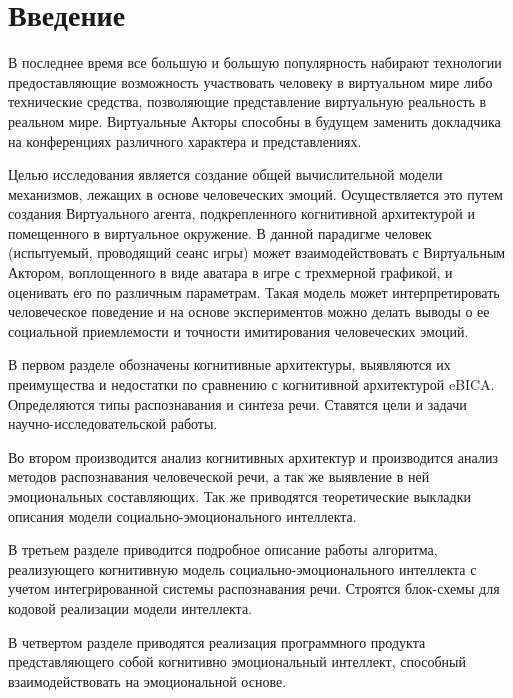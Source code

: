 \chapter*{Введение}
\label{sec:afterwords}


В последнее время все большую и большую популярность набирают технологии предоставляющие возможность участвовать человеку 
в виртуальном мире либо технические средства, позволяющие представление виртуальную реальность в реальном мире. 
Виртуальные Акторы способны в будущем заменить докладчика на конференциях различного характера и представлениях.

Целью исследования является создание общей вычислительной модели механизмов, лежащих в основе человеческих эмоций. Осуществляется это путем создания Виртуального агента, подкрепленного когнитивной архитектурой и помещенного в виртуальное окружение. В данной парадигме человек (испытуемый, проводящий сеанс игры) может взаимодействовать с Виртуальным Актором, воплощенного в виде аватара в игре с трехмерной графикой, и оценивать его по различным параметрам. Такая модель может интерпретировать человеческое поведение и на основе экспериментов можно делать выводы о ее социальной приемлемости и точности имитирования человеческих эмоций.

В первом разделе обозначены когнитивные архитектуры, выявляются их преимущества и недостатки по 
сравнению с когнитивной архитектурой eBICA. Определяются типы распознавания и синтеза речи. 
Ставятся цели и задачи научно-исследовательской работы. 

Во втором производится анализ когнитивных архитектур и производится анализ методов распознавания человеческой речи, а так же выявление в ней эмоциональных составляющих.
Так же приводятся теоретические выкладки описания модели социально-эмоционального интеллекта. 

В третьем разделе приводится подробное описание работы алгоритма, реализующего когнитивную модель социально-эмоционального интеллекта с учетом
интегрированной системы распознавания речи.
Строятся блок-схемы для кодовой реализации модели интеллекта.

В четвертом разделе приводятся реализация программного продукта представляющего собой когнитивно эмоциональный интеллект, 
способный взаимодействовать на эмоциональной основе.